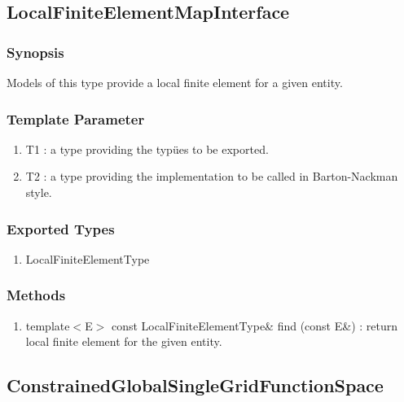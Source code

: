 \documentclass[11pt,a4paper,DIV11,%
notitlepage,oneside,abstracton,%
bibtotoc]{scrartcl}
\begin{document}
\subsection{LocalFiniteElementMapInterface}

\subsubsection{Synopsis}

Models of this type provide a local finite element for a given
entity. 

\subsubsection{Template Parameter}

\begin{enumerate}[1)]
\item T1 : a type providing the typües to be exported.
\item T2 : a type providing the implementation to be called in
  Barton-Nackman style.
\end{enumerate}

\subsubsection{Exported Types}

\begin{enumerate}[1)]
\item LocalFiniteElementType
\end{enumerate}

\subsubsection{Methods}

\begin{enumerate}[1)]
\item template$<$E$>$ const LocalFiniteElementType\& find (const E\&)
  : return local finite element for the given entity.
\end{enumerate}

\subsection{ConstrainedGlobalSingleGridFunctionSpace}
\end{document}
